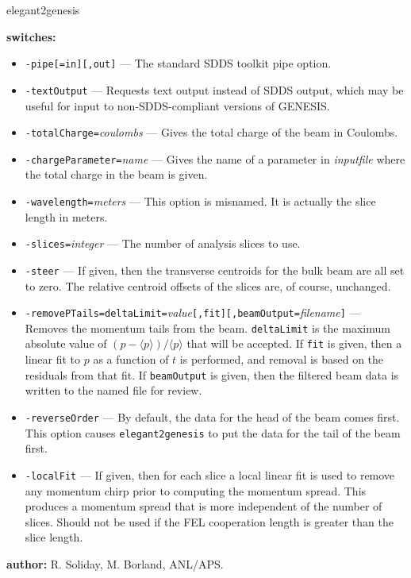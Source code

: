\begin{sddsprog}{elegant2genesis}
  \item {\bf switches:}
  \begin{itemize}
    \item \verb|-pipe[=in][,out]| --- The standard SDDS toolkit pipe option.
    \item \verb|-textOutput| --- Requests text output instead of SDDS output, which may be useful for input to non-SDDS-compliant versions of GENESIS.
    \item \verb|-totalCharge=|{\em coulombs} --- Gives the total charge of the beam in Coulombs.
    \item \verb|-chargeParameter=|{\em name} --- Gives the name of a parameter in {\em inputfile} where the total charge in the beam is given.
    \item \verb|-wavelength=|{\em meters} --- This option is misnamed.  It is actually the slice length in meters.
    \item \verb|-slices=|{\em integer} --- The number of analysis slices to use.
    \item \verb|-steer| --- If given, then the transverse centroids for the bulk beam are all set to zero.  The relative centroid offsets of the slices are, of course, unchanged.
    \item \verb|-removePTails=deltaLimit=|{\em value}\verb|[,fit][,beamOutput=|{\em filename}\verb|]| --- Removes the momentum tails from the beam.  \verb|deltaLimit| is the maximum absolute value of $(p-\langle p \rangle)/\langle p \rangle$ that will be accepted.  If \verb|fit| is given, then a linear fit to $p$ as a function of $t$ is performed, and removal is based on the residuals from that fit.  If \verb|beamOutput| is given, then the filtered beam data is written to the named file for review.
    \item \verb|-reverseOrder| --- By default, the data for the head of the beam comes first.  This option causes \verb|elegant2genesis| to put the data for the tail of the beam first.
    \item \verb|-localFit| --- If given, then for each slice a local linear fit is used to remove any momentum chirp prior to computing the momentum spread.  This produces a momentum spread that is more independent of the number of slices.  Should not be used if the FEL cooperation length is greater than the slice length.
  \end{itemize}

  \item {\bf author:} R. Soliday, M. Borland, ANL/APS.
\end{sddsprog}


